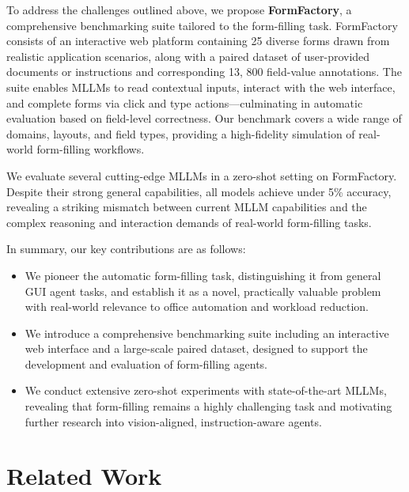 \documentclass[sigconf, screen, review]{acmart}
\begin{document}
To address the challenges outlined above, we propose \textbf{FormFactory}, a comprehensive benchmarking suite tailored to the form-filling task.
FormFactory consists of an interactive web platform containing 25 diverse forms drawn from realistic application scenarios, along with a paired dataset of user-provided documents or instructions and corresponding 13, 800 field-value annotations.
The suite enables MLLMs to read contextual inputs, interact with the web interface, and complete forms via click and type actions—culminating in automatic evaluation based on field-level correctness.
Our benchmark covers a wide range of domains, layouts, and field types, providing a high-fidelity simulation of real-world form-filling workflows.


We evaluate several cutting-edge MLLMs in a zero-shot setting on FormFactory. 
Despite their strong general capabilities, all models achieve under 5\% accuracy, revealing a striking mismatch between current MLLM capabilities and the complex reasoning and interaction demands of real-world form-filling tasks.

In summary, our key contributions are as follows:

\begin{itemize}
\item We pioneer the automatic form-filling task, distinguishing it from general GUI agent tasks, and establish it as a novel, practically valuable problem with real-world relevance to office automation and workload reduction.
\item We introduce a comprehensive benchmarking suite including an interactive web interface and a large-scale paired dataset, designed to support the development and evaluation of form-filling agents.
\item We conduct extensive zero-shot experiments with state-of-the-art MLLMs, revealing that form-filling remains a highly challenging task and motivating further research into vision-aligned, instruction-aware agents.
\end{itemize}



\section{Related Work}
\end{document}
